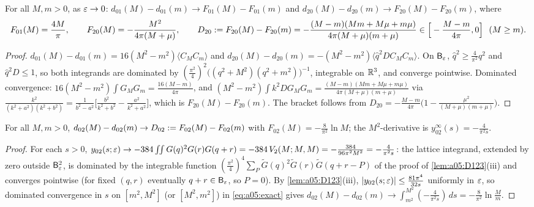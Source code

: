 \begin{lemma}\label{lem:a05:oneloop}
For all $M,m>0$, as $\varepsilon\to0$: $d_{01}(M)-d_{01}(m)\to F_{01}(M)-F_{01}(m)$ and $d_{20}(M)-d_{20}(m)\to F_{20}(M)-F_{20}(m)$, where
\[
F_{01}(M)=\frac{4M}\pi,\qquad F_{20}(M)=-\frac{M^2}{4\pi(M+\mu)},\qquad D_{20}\defeq F_{20}(M)-F_{20}(m)=-\frac{(M-m)(Mm+M\mu+m\mu)}{4\pi(M+\mu)(m+\mu)}\in\Big[-\frac{M-m}{4\pi},0\Big]\ \ (M\ge m).
\]
\end{lemma}
\begin{proof}
$d_{01}(M)-d_{01}(m)=16(M^2-m^2)\langle C_MC_m\rangle$ and $d_{20}(M)-d_{20}(m)=-(M^2-m^2)\langle\hat q^2DC_MC_m\rangle$. On $\mathsf B_{\varepsilon}$, $\hat q^2\ge\frac4{\pi^2}q^2$ and $\hat q^2D\le1$, so both integrands are dominated by $(\frac{\pi^2}4)^2\big((q^2+M^2)(q^2+m^2)\big)^{-1}$, integrable on $\mathbb R^3$, and converge pointwise. Dominated convergence: $16(M^2-m^2)\int G_MG_m=\frac{16(M-m)}{4\pi}$, and $(M^2-m^2)\int k^2DG_MG_m=\frac{(M-m)(Mm+M\mu+m\mu)}{4\pi(M+\mu)(m+\mu)}$ via $\frac{k^2}{(k^2+a^2)(k^2+b^2)}=\frac1{b^2-a^2}\big[\frac{b^2}{k^2+b^2}-\frac{a^2}{k^2+a^2}\big]$, which is $F_{20}(M)-F_{20}(m)$. The bracket follows from $D_{20}=-\frac{M-m}{4\pi}\big(1-\frac{\mu^2}{(M+\mu)(m+\mu)}\big)$.
\end{proof}

\begin{lemma}\label{lem:a05:02}
For all $M,m>0$, $d_{02}(M)-d_{02}(m)\to D_{02}:= F_{02}(M)-F_{02}(m)$ with $F_{02}(M)=-\frac8{\pi^2}\ln M$; the $M^2$-derivative is $y^\infty_{02}(s)=-\frac4{\pi^2s}$.
\end{lemma}
\begin{proof}
For each $s>0$, $y_{02}(s;\varepsilon)\to-384\int\!\!\int G(q)^2G(r)G(q+r)=-384\,V_2(M;M,M)=-\frac{384}{96\pi^2M^2}=-\frac4{\pi^2s}$: the lattice integrand, extended by zero outside $\mathsf B_{\varepsilon}^2$, is dominated by the integrable function $(\frac{\pi^2}4)^4\sum_P\tilde G(q)^2\tilde G(r)\tilde G(q+r-P)$ of the proof of \cref{lem:a05:D123}(iii) and converges pointwise (for fixed $(q,r)$ eventually $q+r\in\mathsf B_{\varepsilon}$, so $P=0$). By \cref{lem:a05:D123}(iii), $|y_{02}(s;\varepsilon)|\le\frac{81\pi^4}{32s}$ uniformly in $\varepsilon$, so dominated convergence in $s$ on $[m^2,M^2]$ (or $[M^2,m^2]$) in \eqref{eq:a05:exact} gives $d_{02}(M)-d_{02}(m)\to\int_{m^2}^{M^2}(-\frac4{\pi^2s})\,ds=-\frac8{\pi^2}\ln\frac Mm$.
\end{proof}

